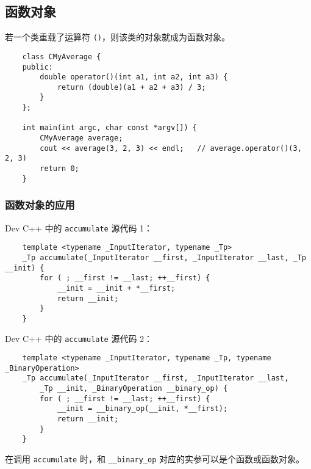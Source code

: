 \documentclass[UTF8]{ctexart}
\begin{document}
\subsection{函数对象}
若一个类重载了运算符 \texttt{()}，则该类的对象就成为函数对象。
\begin{verbatim}
    class CMyAverage {
    public:
        double operator()(int a1, int a2, int a3) {
            return (double)(a1 + a2 + a3) / 3;
        }
    };

    int main(int argc, char const *argv[]) {
        CMyAverage average;
        cout << average(3, 2, 3) << endl;   // average.operator()(3, 2, 3)
        return 0;
    }
\end{verbatim}

\subsubsection{函数对象的应用}
Dev C++ 中的 \texttt{accumulate} 源代码 1：
\begin{verbatim}
    template <typename _InputIterator, typename _Tp>
    _Tp accumulate(_InputIterator __first, _InputIterator __last, _Tp __init) {
        for ( ; __first != __last; ++__first) {
            __init = __init + *__first;
            return __init;
        }
    }
\end{verbatim}

Dev C++ 中的 \texttt{accumulate} 源代码 2：
\begin{verbatim}
    template <typename _InputIterator, typename _Tp, typename _BinaryOperation>
    _Tp accumulate(_InputIterator __first, _InputIterator __last,
        _Tp __init, _BinaryOperation __binary_op) {
        for ( ; __first != __last; ++__first) {
            __init = __binary_op(__init, *__first);
            return __init;
        }
    }
\end{verbatim}
在调用 \texttt{accumulate} 时，和 \texttt{\_\_binary\_op} 对应的实参可以是个函数或函数对象。
\end{document}
